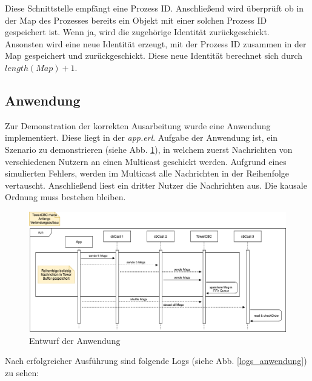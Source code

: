Diese Schnittstelle empfängt eine Prozess ID. Anschließend wird überprüft ob in der Map des Prozesses bereits ein Objekt mit einer solchen Prozess ID gespeichert ist. Wenn ja, wird die zugehörige Identität zurückgeschickt. Ansonsten wird eine neue Identität erzeugt, mit der Prozess ID zusammen in der Map gespeichert und zurückgeschickt. Diese neue Identität berechnet sich durch $length(Map) + 1$.

\newpage

\subsection{Anwendung}

Zur Demonstration der korrekten Ausarbeitung wurde eine Anwendung implementiert. Diese liegt in der \textit{app.erl}.
Aufgabe der Anwendung ist, ein Szenario zu demonstrieren (siehe Abb. \ref{seq:entwurf_anwendung}), in welchem zuerst Nachrichten von verschiedenen Nutzern an einen Multicast geschickt werden. Aufgrund eines simulierten Fehlers, werden im Multicast alle Nachrichten in der Reihenfolge vertauscht. Anschließend liest ein dritter Nutzer die Nachrichten aus. Die kausale Ordnung muss bestehen bleiben.

\begin{figure}[htbp]
\begin{center}
\includegraphics[scale=0.45]{Latex/Bilder/entwurf.png}
\caption{\label{seq:entwurf_anwendung} Entwurf der Anwendung}
\end{center}
\end{figure}

Nach erfolgreicher Ausführung sind folgende Logs (siehe Abb. \ref{logs_anwendung}) zu sehen:

